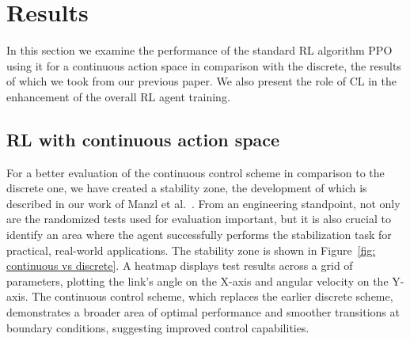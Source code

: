 \section{Results}

In this section we examine the performance of the standard RL algorithm PPO using it for a continuous action space in comparison with the discrete, the results of which we took from our previous paper. We also present the role of CL in the enhancement of the overall RL agent training. 

\subsection{RL with continuous action space} \label{subsec: RL with continuous action space}
For a better evaluation of the continuous control scheme in comparison to the discrete one, we have created a stability zone, the development of which is described in our work of Manzl et al.~\cite{manzl2023relrl}. From an engineering standpoint, not only are the randomized tests used for evaluation important, but it is also crucial to identify an area where the agent successfully performs the stabilization task for practical, real-world applications. The stability zone is shown in Figure~\ref{fig: continuous vs discrete}. A heatmap displays test results across a grid of parameters, plotting the link's angle on the X-axis and angular velocity on the Y-axis. The continuous control scheme, which replaces the earlier discrete scheme, demonstrates a broader area of optimal performance and smoother transitions at boundary conditions, suggesting improved control capabilities.

